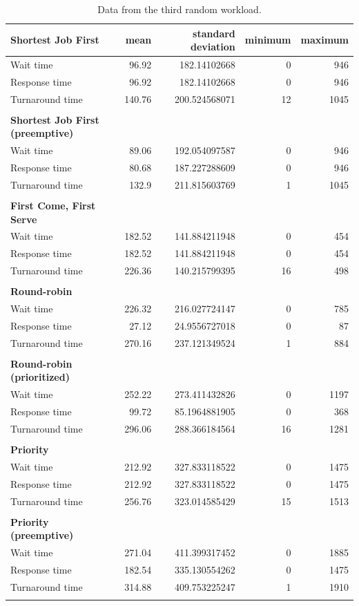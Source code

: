 \documentclass[12pt,letterpaper]{article}
\begin{document}
\begin{appendices}
			\begin{table}[H]
	  			\caption{Data from the third random workload.}
		  		\begin{tabular}{l r r r r}
					\textbf{Shortest Job First} & mean & standard deviation & minimum & maximum\\
					\hline
Wait time &			96.92 &	182.14102668 &	0 &	946 	\\
Response time &		96.92 &	182.14102668 &	0 &	946 	\\
Turnaround time &	140.76 &	200.524568071 &	12 &	1045 	\\
					\\
					\textbf{Shortest Job First (preemptive)} \\
					\hline
Wait time &			89.06 &	192.054097587 &	0 &	946 	\\
Response time &		80.68 &	187.227288609 &	0 &	946 	\\
Turnaround time &	132.9 &	211.815603769 &	1 &	1045 	\\
					\\
					\textbf{First Come, First Serve} \\
					\hline
Wait time &			182.52 &	141.884211948 &	0 &	454 	\\
Response time &		182.52 &	141.884211948 &	0 &	454 	\\
Turnaround time &	226.36 &	140.215799395 &	16 & 498 	\\
					\\
					\textbf{Round-robin} \\
					\hline
Wait time &			226.32 &	216.027724147 &	0 &	785 	\\
Response time &		27.12 &	24.9556727018 &	0 &	87 	\\
Turnaround time &	270.16 &	237.121349524 &	1 &	884 	\\
					\\
					\textbf{Round-robin (prioritized)} \\
					\hline
Wait time &			252.22 &	273.411432826 &	0 &	1197 	\\
Response time &		99.72 &	85.1964881905 &	0 &	368 	\\
Turnaround time &	296.06 &	288.366184564 &	16 &	1281 	\\
					\\
					\textbf{Priority} \\
					\hline
Wait time &			212.92 &	327.833118522 &	0 &	1475	\\
Response time &		212.92 &	327.833118522 &	0 &	1475 	\\
Turnaround time &	256.76 &	323.014585429 &	15 &	1513 	\\
					\\
					\textbf{Priority (preemptive)} \\
					\hline
Wait time &			271.04 &	411.399317452 &	0 &	1885 	\\
Response time &		182.54 &	335.130554262 &	0 &	1475 	\\
Turnaround time &	314.88 &	409.753225247 &	1 &	1910 	\\
					\\
				\end{tabular}
	 			\label{table:data-rand3}
			\end{table}


\end{appendices}
\end{document}
